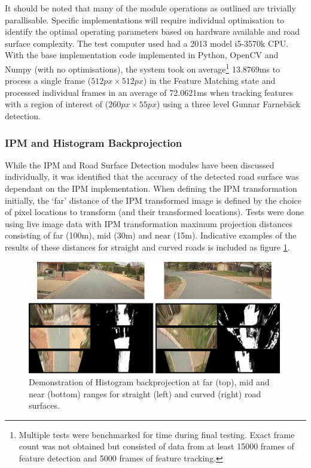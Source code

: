 \documentclass[]{aiaa-tc}%
\begin{document}
It should be noted that many of the module operations as outlined are trivially parallisable. Specific implementations will require individual optimisation to identify the optimal operating parameters based on hardware available and road surface complexity. The test computer used had a 2013 model i5-3570k CPU. With the base implementation code implemented in Python, OpenCV and Numpy (with no optimisations), the system took on average\footnote{Multiple tests were benchmarked for time during final testing. Exact frame count was not obtained but consisted of data from at least 15000 frames of feature detection and 5000 frames of feature tracking.} 13.8769ms to process a single frame ($512px \times 512px$) in the Feature Matching state and processed individual frames in an average of 72.0621ms when tracking features with a region of interest of ($260px \times 55px$) using a three level Gunnar Farneb{\"a}ck detection.

\subsubsection{IPM and Histogram Backprojection}

While the IPM and Road Surface Detection modules have been discussed individually, it was identified that the accuracy of the detected road surface was dependant on the IPM implementation. When defining the IPM transformation initially, the `far' distance of the IPM transformed image is defined by the choice of pixel locations to transform (and their transformed locations). Tests were done using live image data with IPM transformation maximum projection distances consisting of far (100m), mid (30m) and near (15m). Indicative examples of the results of these distances for straight and curved roads is included as figure \ref{f:ipmHistogramResults}.


\begin{figure}{}
	\centering
	\includegraphics[width=0.99\textwidth]{Results/ipmHistogramResults.png}
	\caption{Demonstration of Histogram backprojection at far (top), mid and near (bottom) ranges for straight (left) and curved (right) road surfaces.}
	\label{f:ipmHistogramResults}
\end{figure}
\end{document}
